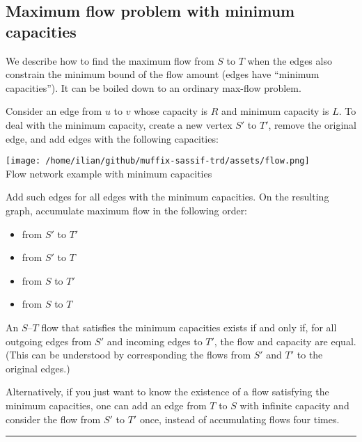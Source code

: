 \documentclass[9pt,a4paper,landscape,twosided]{extarticle}
\begin{document}
\begin{multicols*}{3}
\section*{Maximum flow problem with minimum capacities}

We describe how to find the maximum flow from $S$ to $T$ when the edges also constrain the minimum bound of the flow amount (edges have ``minimum capacities''). It can be boiled down to an ordinary max-flow problem.

Consider an edge from $u$ to $v$ whose capacity is $R$ and minimum capacity is $L$. To deal with the minimum capacity, create a new vertex $S'$ to $T'$, remove the original edge, and add edges with the following capacities:

\begin{center}
    \texttt{[image: /home/ilian/github/muffix-sassif-trd/assets/flow.png]} \\
    Flow network example with minimum capacities
\end{center}

Add such edges for all edges with the minimum capacities. On the resulting graph, accumulate maximum flow in the following order:

\begin{itemize}
    \item from $S'$ to $T'$
    \item from $S'$ to $T$
    \item from $S$ to $T'$
    \item from $S$ to $T$
\end{itemize}

An $S$--$T$ flow that satisfies the minimum capacities exists if and only if, for all outgoing edges from $S'$ and incoming edges to $T'$, the flow and capacity are equal. (This can be understood by corresponding the flows from $S'$ and $T'$ to the original edges.)

Alternatively, if you just want to know the existence of a flow satisfying the minimum capacities, one can add an edge from $T$ to $S$ with infinite capacity and consider the flow from $S'$ to $T'$ once, instead of accumulating flows four times.
\noindent\rule{\linewidth}{0.15mm}


\end{multicols*}
\end{document}
